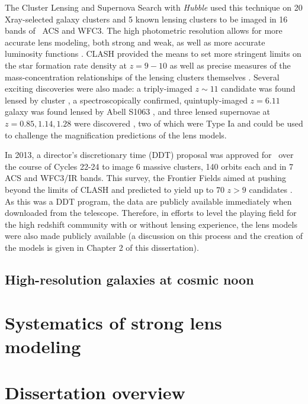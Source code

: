 The Cluster Lensing and Supernova Search with {\it Hubble} \citep[CLASH; ][]{Postman:2012lr} used this technique on 20 Xray-selected galaxy clusters and 5 known lensing clusters to be imaged in 16 bands of \hst\ ACS and WFC3. The high photometric resolution allows for more accurate lens modeling, both strong and weak, as well as more accurate luminosity functions \citep{Jouvel:2014qy}. CLASH provided the means to set more stringent limits on the star formation rate density at $z=9-10$ \citep{Bouwens:2014zp} as well as precise measures of the mass-concentration relationships of the lensing clusters themselves \citep{Merten:2015rz,Meneghetti:2014ys}. Several exciting discoveries were also made: a triply-imaged $z\sim11$ candidate was found lensed by cluster \citep{Coe:2013tg}, a spectroscopically confirmed, quintuply-imaged $z=6.11$ galaxy was found lensed by Abell S1063 \citep{Monna:2014lr,Balestra:2013uq}, and three lensed supernovae at $z=0.85,1.14,1.28$ were discovered \citep{Patel:2014kl}, two of which were Type Ia and could be used to challenge the magnification predictions of the lens models.

In 2013, a director's discretionary time (DDT) proposal was approved for \hst\ over the course of Cycles 22-24 to image 6 massive clusters, 140 orbits each and in 7 ACS and WFC3/IR bands. This survey, the Frontier Fields \citep{Lotz:2017gd} aimed at pushing beyond the limits of CLASH and predicted to yield up to 70 $z>9$ candidates \cite{Coe:2015qf}. As this was a DDT program, the data are publicly available immediately when downloaded from the telescope. Therefore, in efforts to level the playing field for the high redshift community with or without lensing experience, the lens models were also made publicly available (a discussion on this process and the creation of the models is given in Chapter 2 of this dissertation).

\subsection{High-resolution galaxies at cosmic noon}

\section{Systematics of strong lens modeling}

\section{Dissertation overview}




